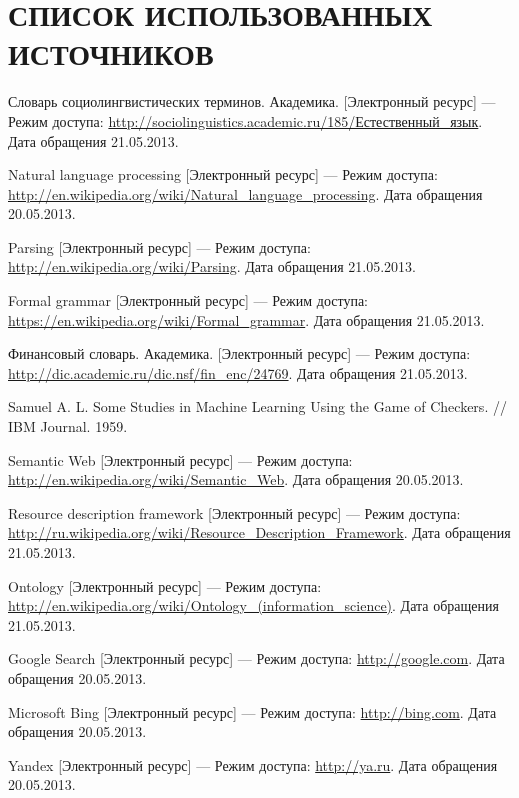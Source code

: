 \renewcommand*{\refname}{}
\section*{\centering СПИСОК ИСПОЛЬЗОВАННЫХ ИСТОЧНИКОВ}
\begin{thebibliography}{99}	
	Словарь социолингвистических терминов. Академика. [Электронный ресурс] --- Режим доступа: \url{http://sociolinguistics.academic.ru/185/Естественный_язык}. Дата обращения 21.05.2013.

	Natural language processing [Электронный ресурс] --- Режим доступа: \url{http://en.wikipedia.org/wiki/Natural_language_processing}. Дата обращения 20.05.2013.	

	Parsing [Электронный ресурс] --- Режим доступа: \url{http://en.wikipedia.org/wiki/Parsing}. Дата обращения 21.05.2013.	

	Formal grammar [Электронный ресурс] --- Режим доступа: \url{https://en.wikipedia.org/wiki/Formal_grammar}. Дата обращения 21.05.2013.

	Финансовый словарь. Академика. [Электронный ресурс] --- Режим доступа: \url{http://dic.academic.ru/dic.nsf/fin_enc/24769}. Дата обращения 21.05.2013.

	Samuel A. L. Some Studies in Machine Learning Using the Game of Checkers. // IBM Journal. 1959.	

	Semantic Web [Электронный ресурс] --- Режим доступа: \url{http://en.wikipedia.org/wiki/Semantic_Web}. Дата обращения 20.05.2013.	

	Resource description framework [Электронный ресурс] --- Режим доступа: \url{http://ru.wikipedia.org/wiki/Resource_Description_Framework}. Дата обращения 21.05.2013.	

	Ontology [Электронный ресурс] --- Режим доступа: \url{http://en.wikipedia.org/wiki/Ontology_(information_science)}. Дата обращения 21.05.2013. 

	Google Search [Электронный ресурс] --- Режим доступа: \url{http://google.com}. Дата обращения 20.05.2013.

	Microsoft Bing [Электронный ресурс] --- Режим доступа: \url{http://bing.com}. Дата обращения 20.05.2013.

	Yandex [Электронный ресурс] --- Режим доступа: \url{http://ya.ru}. Дата обращения 20.05.2013.


\end{thebibliography}

